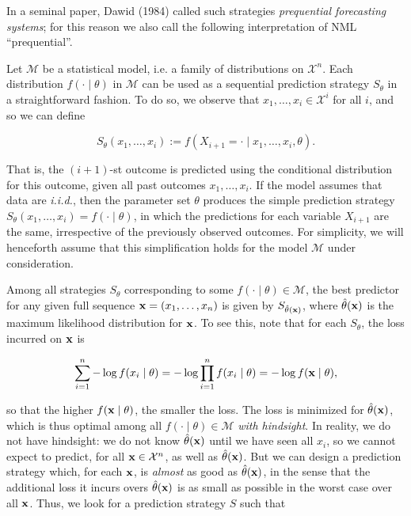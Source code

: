 \documentclass[authoryear]{elsarticle}
\newcommand{\model}{\mathcal{M}}
\newcommand{\sspace}[2]{\mathcal{#1}^{#2}}
\newcommand{\iid}{{\it i.i.d.}}
\newcommand{\vx}{\ensuremath{{\bf x}}}
\begin{document}
In a seminal paper, Dawid (1984) called such strategies {\em prequential forecasting systems\/};
for this reason we also call the following interpretation of NML ``prequential''.

Let $\model$ be a statistical model, i.e. a family of
distributions on ${\sspace{X}{n}}$. Each distribution $f(\cdot \mid
\theta)$ in $\model$ can be used as a sequential prediction strategy $S_{\theta}$
in a straightforward fashion. To do so, we observe that
$x_1, \ldots, x_i \in {\sspace{X}{i}}$ for all $i$, and so we can define

\vspace*{-12pt}
$$
S_\theta(x_1, \ldots, x_i) := f(X_{i+1} = \cdot \mid x_1, \ldots, x_i, \theta).
$$

That is, the $(i+1)$-st outcome is predicted using the conditional
distribution for this outcome, given all past outcomes $x_1, \ldots,
x_i$. If the model assumes that data are \iid, then the parameter set
$\theta$ produces the simple prediction strategy
$S_{\theta}(x_1, \ldots, x_i) = f(\cdot \mid \theta)$, in which the
predictions for each variable $X_{i+1}$ are the same, irrespective of
the previously observed outcomes. For simplicity,
we will henceforth assume that this simplification holds for the model
$\model$ under consideration.

Among all strategies $S_{\theta}$ corresponding to some $f(\cdot \mid
\theta) \in \model$, the best predictor for any given full sequence
$\vx = (x_1, \ldots, x_n)$ is given by $S_{\hat{\theta}(\vx)}$, where
$\hat{\theta}(\vx)$ is the maximum likelihood distribution for
$\vx$. To see this, note that for each $S_\theta$, the loss incurred on
$\vx$ is

 \vspace*{-12pt}
$$
\sum_{i=1}^n - \log f(x_i \mid \theta) = - \log \prod_{i=1}^n f(x_i
\mid \theta) = - \log f(\vx \mid \theta),
$$

so that the higher $f(\vx \mid \theta)$, the smaller the loss. The
loss is minimized for $\hat{\theta}(\vx)$, which is thus optimal among
all $f(\cdot \mid \theta) \in \model$ {\em
  with hindsight}. In reality, we do not have hindsight: we do not know $\hat{\theta}(\vx)$
until we have seen all $x_i$, so we cannot expect to predict, for all
$\vx \in {\sspace{X}{n}}$, as well
as $\hat{\theta}(\vx)$. But we can design a prediction strategy which,
for each $\vx$,
is {\em almost\/} as good as $\hat{\theta}(\vx)$, in the sense that
the additional loss it incurs overs $\hat{\theta}(\vx)$ is as small as
possible in the worst case over all $\vx$. Thus, we look for a
prediction strategy $S$ such that
\end{document}
